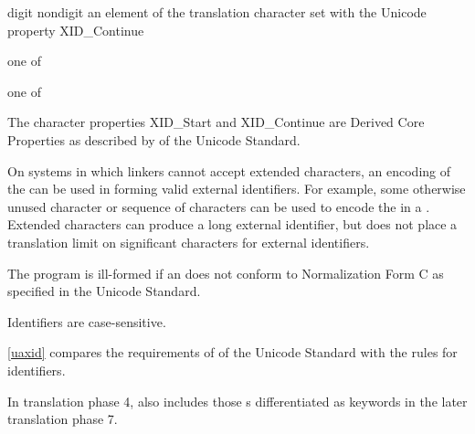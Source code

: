 \begin{bnf}
\br
    digit\br
    nondigit\br
    \textnormal{an element of the translation character set with the Unicode property XID_Continue}
\end{bnf}

\begin{bnf}
 \textnormal{one of}\br
    \br
    \br
    \br
\end{bnf}

\begin{bnf}
 \textnormal{one of}\br
\end{bnf}

\pnum
{}%
%
\begin{note}
The character properties XID_Start and XID_Continue are Derived Core Properties
as described by  of the Unicode Standard.
\begin{footnote}
On systems in which linkers cannot accept extended
characters, an encoding of the  can be used in
forming valid external identifiers. For example, some otherwise unused
character or sequence of characters can be used to encode the
 in a . Extended
characters can produce a long external identifier, but \Cpp{} does not
place a translation limit on significant characters for external
identifiers.
\end{footnote}
\end{note}
The program is ill-formed
if an  does not conform to
Normalization Form C as specified in the Unicode Standard.
\begin{note}
Identifiers are case-sensitive.
\end{note}
\begin{note}
\ref{uaxid} compares the requirements of  of the Unicode Standard
with the \Cpp{} rules for identifiers.
\end{note}
\begin{note}
In translation phase 4,
 also includes
those s
differentiated as keywords
in the later translation phase 7.
\end{note}

